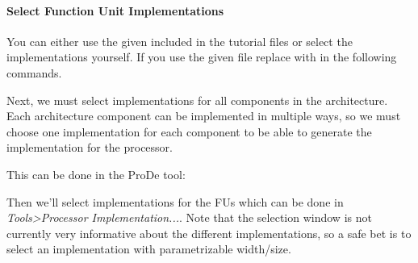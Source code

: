 \documentclass[twoside]{tceusermanual}
\begin{document}
\paragraph{Select Function Unit Implementations}

% 
% 
% 
% 
% 
You can either use the given  included in the
tutorial files or select the implementations yourself. If you use the given
file replace  with  in the
following commands.

Next, we must select implementations for all components in the architecture.
Each architecture component can be implemented in multiple ways, so we must
choose one implementation for each component to be able to generate the
implementation for the processor.

This can be done in the ProDe tool:


Then we'll select implementations for the FUs which can be done in
\textit{Tools>Processor Implementation...}. Note that the selection window
is not currently very informative about the different implementations, so a
safe bet is to select an implementation with parametrizable width/size.
\end{document}
